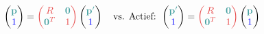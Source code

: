 \documentclass[12pt]{article}
\renewcommand{\vec}[1]{\textcolor{vectorTeal}{\mathbf{#1}}}
\newcommand{\scalar}[1]{\textcolor{scalarBrightBlue}{#1}}
\newcommand{\mat}[1]{\textcolor{matrixSoftRed}{#1}}
\begin{document}
\[
\begin{pmatrix} \vec{p} \\ \scalar{1} \end{pmatrix} = \mat{\begin{pmatrix} R & \vec{0} \\ \vec{0}^T & 1 \end{pmatrix}} \begin{pmatrix} \vec{p'} \\ \scalar{1} \end{pmatrix}
\quad \text{vs. Actief: }
\begin{pmatrix} \vec{p'} \\ \scalar{1} \end{pmatrix} = \mat{\begin{pmatrix} R & \vec{0} \\ \vec{0}^T & 1 \end{pmatrix}} \begin{pmatrix} \vec{p} \\ \scalar{1} \end{pmatrix}
\]
\end{document}
